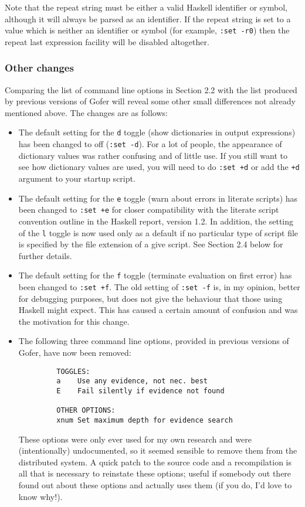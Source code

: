Note that the repeat string must be either a valid Haskell identifier or
symbol, although it will always be parsed as an identifier.  If the
repeat string is set to a value which is neither an identifier or symbol
(for example, \verb":set -r0") then the repeat last expression facility will be
disabled altogether.


\subsubsection{Other changes}
Comparing the list of command line options in Section 2.2 with the list
produced by previous versions of Gofer will reveal some other small
differences not already mentioned above.  The changes are as follows:
\begin{itemize}
\item  The default setting for the \verb"d" toggle (show dictionaries in output
     expressions) has been changed to off (\verb":set -d").  For a lot of
     people, the appearance of dictionary values was rather confusing
     and of little use.  If you still want to see how dictionary values
     are used, you will need to do \verb":set +d" or add the \verb"+d" argument to
     your startup script.

\item  The default setting for the \verb"e" toggle (warn about errors in
     literate scripts) has been changed to \verb":set +e" for closer
     compatibility with the literate script convention outline in the
     Haskell report, version 1.2.  In addition, the setting of the \verb"l"
     toggle is now used only as a default if no particular type of
     script file is specified by the file extension of a give script.
     See Section 2.4 below for further details.

\item  The default setting for the \verb"f" toggle (terminate evaluation on
     first error) has been changed to \verb":set +f".  The old setting of
     \verb":set -f" is, in my opinion, better for debugging purposes, but
     does not give the behaviour that those using Haskell might
     expect.  This has caused a certain amount of confusion and was
     the motivation for this change.

\item  The following three command line options, provided in previous
     versions of Gofer, have now been removed:
\begin{verbatim}
         TOGGLES:
         a    Use any evidence, not nec. best
         E    Fail silently if evidence not found

         OTHER OPTIONS:
         xnum Set maximum depth for evidence search
\end{verbatim}
     These options were only ever used for my own research and were
     (intentionally) undocumented, so it seemed sensible to remove them
     from the distributed system.  A quick patch to the source code and
     a recompilation is all that is necessary to reinstate these
     options; useful if somebody out there found out about these
     options and actually uses them (if you do, I'd love to know
     why!).
\end{itemize}

